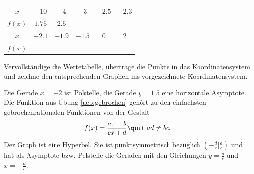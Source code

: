 \documentclass[%
11pt,%
twoside,%
titlepage,%
german,%
headsepline%
]{scrartcl}
\newcommand{\spaltenheight}{\rule{0mm}{3ex}}
\newcommand{\spaltensep}{\\[1ex]}
\begin{document}
\begin{table}
\small
\centering
\begin{tabular}{|c|c|c|c|c|c|} \hline
\rowcolor{Gray} $x$ & $-10$ & $-4$ & $-3$ & $-2.5$ & $-2.3$\\ \hline
\rowcolor{lightyellow}\spaltenheight $f(x)$ & $1.75$ & $2.5$ &  &  & \spaltensep \hline
\rowcolor{Gray} $x$ & $-2.1$ & $-1.9$ & $-1.5$ & $0$ & $2$\\ \hline
\rowcolor{lightyellow}\spaltenheight $f(x)$ &  &  &  &  & \spaltensep \hline

\end{tabular}
\end{table}

\begin{ueb}\label{ueb:gebrochen}
Vervollständige die Wertetabelle, übertrage die Punkte in das Koordinatensystem und zeichne den entsprechenden Graphen ins vorgezeichnete Koordinatensystem.

\begin{center}
\end{center}
\end{ueb}

Die Gerade $x=-2$ ist Polstelle, die Gerade $y= 1.5$ eine horizontale Asymptote.
Die Funktion aus Übung \ref{ueb:gebrochen} gehört zu den einfachsten gebrochenrationalen Funktionen von der Gestalt
$$f(x)=\frac{ax+b}{cx+d}\q\text{mit }ad\neq bc.$$
Der Graph ist eine Hyperbel. Sie ist punktsymmetrisch bezüglich $(-\frac{d}{c}|\frac{a}{c})$ und hat als Asymptote bzw. Polstelle die Geraden mit den Gleichungen $y=\frac{a}{c}$ und $x=-\frac{d}{c}$.
\end{document}
